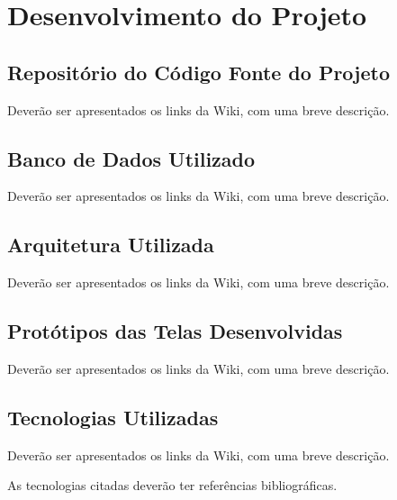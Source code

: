 \section[Desenvolvimento do Projeto]{Desenvolvimento do Projeto}

\subsection{Repositório do Código Fonte do Projeto}
  Deverão ser apresentados os links da Wiki, com uma breve descrição.

\subsection{Banco de Dados Utilizado}
  Deverão ser apresentados os links da Wiki, com uma breve descrição.

\subsection{Arquitetura Utilizada}
  Deverão ser apresentados os links da Wiki, com uma breve descrição.

\subsection{Protótipos das Telas Desenvolvidas}
  Deverão ser apresentados os links da Wiki, com uma breve descrição.

\subsection{Tecnologias Utilizadas}
  Deverão ser apresentados os links da Wiki, com uma breve descrição.
  
  As tecnologias citadas deverão ter referências bibliográficas.
